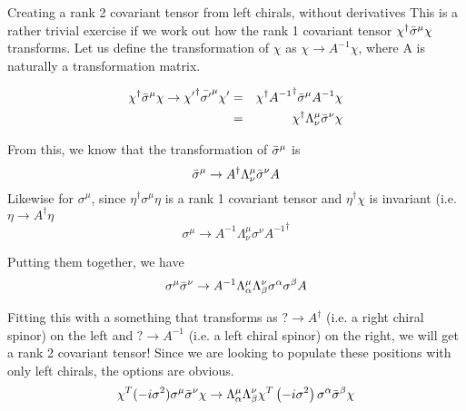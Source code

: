 \begin{question}{Creating a rank 2 covariant tensor from left chirals, without derivatives}
    This is a rather trivial exercise if we work out how the rank 1 covariant tensor $\chi^\dagger \Bar{\sigma}^\mu \chi$ transforms. Let us define the transformation of $\chi$ as $\chi \rightarrow A^{-1} \chi $, where A is naturally a transformation matrix.
    
    \begin{eqnarray*}
        \chi^\dagger \Bar{\sigma}^\mu \chi \rightarrow {\chi'}^\dagger \Bar{\sigma'}^\mu \chi' &=& \chi^\dagger {A^{-1}}^\dagger \Bar{\sigma}^\mu A^{-1} \chi
        \nonumber \\
        &=& \chi^\dagger \Lambda^\mu_\nu \Bar{\sigma}^\nu\chi
    \end{eqnarray*}
    
    From this, we know that the transformation of $\Bar{\sigma}^\mu$ is
    \begin{equation*}
        \Bar{\sigma}^\mu \rightarrow A^\dagger \Lambda^\mu_\nu \Bar{\sigma}^\nu A
    \end{equation*}
    Likewise for $\sigma^\mu$, since $\eta^\dagger \sigma^\mu \eta$ is a rank 1 covariant tensor and $\eta^\dagger\chi$ is invariant (i.e. $\eta \rightarrow A^\dagger \eta$
    \begin{equation*}
        \sigma^\mu \rightarrow A^{-1} \Lambda^\mu_\nu \sigma^\nu {A^{-1}}^\dagger
    \end{equation*}
    
    Putting them together, we have
    \begin{equation*}
        \sigma^\mu \Bar{\sigma}^\nu \rightarrow A^{-1}\Lambda^\mu_\alpha\Lambda^\nu_\beta \sigma^\alpha \sigma^\beta A
    \end{equation*}
    
    Fitting this with a something that transforms as $? \rightarrow A^\dagger$ (i.e. a right chiral spinor) on the left and $? \rightarrow A^{-1}$ (i.e. a left chiral spinor) on the right, we will get a rank 2 covariant tensor! Since we are looking to populate these positions with only left chirals, the options are obvious.
    \begin{equation*}
        \chi^T (-i \sigma^2) \sigma^\mu \Bar{\sigma}^\nu \chi \rightarrow \Lambda^\mu_\alpha \Lambda^\nu_\beta \chi^T \left( -i \sigma^2\right) \sigma^\alpha \Bar{\sigma}^\beta \chi
    \end{equation*}
\end{question}


